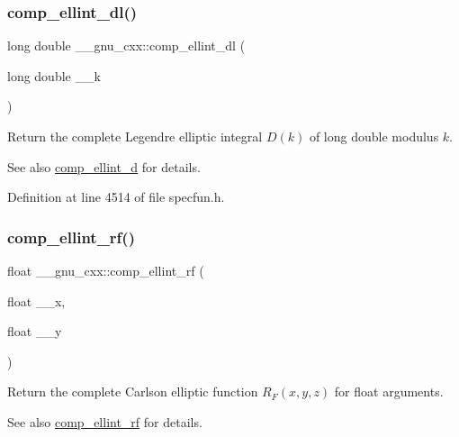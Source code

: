 \subsubsection{\texorpdfstring{comp\+\_\+ellint\+\_\+dl()}{comp\_ellint\_dl()}}
{\footnotesize\ttfamily long double \+\_\+\+\_\+gnu\+\_\+cxx\+::comp\+\_\+ellint\+\_\+dl (\begin{DoxyParamCaption}\item[{long double}]{\+\_\+\+\_\+k }\end{DoxyParamCaption})\hspace{0.3cm}{\ttfamily [inline]}}

Return the complete Legendre elliptic integral $ D(k) $ of {\ttfamily long double} modulus $ k $.

\begin{DoxySeeAlso}{See also}
\hyperlink{group__gnu__math__spec__func_ga3fe79a91524b43ffc5ffb83c0eb2bd00}{comp\+\_\+ellint\+\_\+d} for details. 
\end{DoxySeeAlso}


Definition at line 4514 of file specfun.\+h.

\mbox{\label{group__gnu__math__spec__func_ga55ae30b4f8ff15017d18a80050e14e38}} 
\subsubsection{\texorpdfstring{comp\+\_\+ellint\+\_\+rf()}{comp\_ellint\_rf()}\hspace{0.1cm}{\footnotesize\ttfamily [1/3]}}
{\footnotesize\ttfamily float \+\_\+\+\_\+gnu\+\_\+cxx\+::comp\+\_\+ellint\+\_\+rf (\begin{DoxyParamCaption}\item[{float}]{\+\_\+\+\_\+x,  }\item[{float}]{\+\_\+\+\_\+y }\end{DoxyParamCaption})\hspace{0.3cm}{\ttfamily [inline]}}

Return the complete Carlson elliptic function $ R_F(x,y,z) $ for {\ttfamily float} arguments.

\begin{DoxySeeAlso}{See also}
\hyperlink{group__gnu__math__spec__func_ga55ae30b4f8ff15017d18a80050e14e38}{comp\+\_\+ellint\+\_\+rf} for details. 
\end{DoxySeeAlso}


